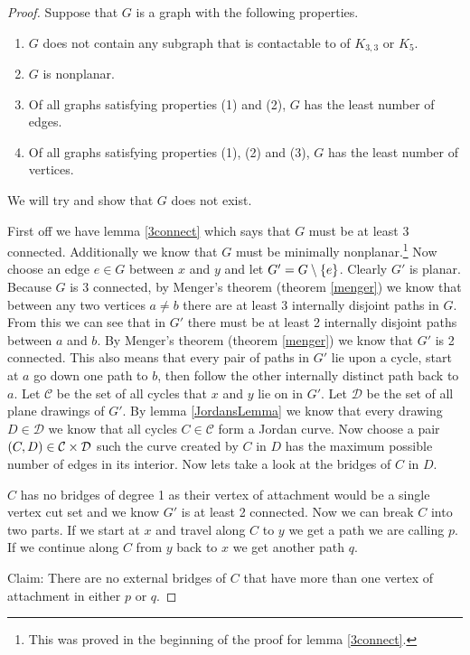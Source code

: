 \documentclass{article}
\begin{document}
\begin{proof}
	Suppose that $G$ is a graph with the following properties.
	\begin{enumerate}
		\item $G$ does not contain any subgraph that is contactable to of $K_{3,3}$ or $K_5$.
		\item $G$ is nonplanar.
		\item Of all graphs satisfying properties (1) and (2), $G$ has the least number of edges.
		\item Of all graphs satisfying properties (1), (2) and (3), $G$ has the least number of vertices.
	\end{enumerate}
	We will try and show that $G$ does not exist.

	First off we have lemma \ref{3connect} which says that $G$ must be at least 3 connected. Additionally we know that $G$ must be minimally nonplanar.\footnote{This was proved in the beginning of the proof for lemma \ref{3connect}.} Now choose an edge $e \in G$ between $x$ and $y$ and let $G' = G\setminus\left\{ {e} \right\}$. Clearly $G'$ is planar. Because $G$ is 3 connected, by Menger's theorem (theorem \ref{menger}) we know that between any two vertices $a\not=b$ there are at least 3 internally disjoint paths in $G$. From this we can see that in $G'$ there must be at least 2 internally disjoint paths between $a$ and $b$. By Menger's theorem (theorem \ref{menger}) we know that $G'$ is 2 connected. This also means that every pair of paths in $G'$ lie upon a cycle, start at $a$ go down one path to $b$, then follow the other internally distinct path back to $a$. Let $\mathcal C$ be the set of all cycles that $x$ and $y$ lie on in $G'$. Let $\mathcal D$ be the set of all plane drawings of $G'$. By lemma \ref{JordansLemma} we know that every drawing $D\in\mathcal D$ we know that all cycles $C\in\mathcal C$ form a Jordan curve. Now choose a pair $\left( {C} , {D} \right) \in \mathcal C\times\mathcal D$ such the curve created by $C$ in $D$ has the maximum possible number of edges in its interior. Now lets take a look at the bridges of $C$ in $D$.
	
	$C$ has no bridges of degree 1 as their vertex of attachment would be a single vertex cut set and we know $G'$ is at least 2 connected. Now we can break $C$ into two parts. If we start at $x$ and travel along $C$ to $y$ we get a path we are calling $p$. If we continue along $C$ from $y$ back to $x$ we get another path $q$.
	
	Claim: There are no external bridges of $C$ that have more than one vertex of attachment in either $p$ or $q$.
	

\end{proof}
\end{document}
